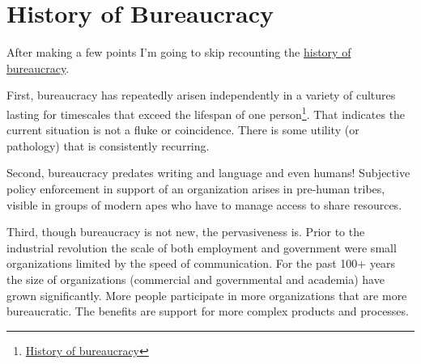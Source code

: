 \section{History of Bureaucracy}

After making a few points I'm going to skip recounting the \href{https://en.wikipedia.org/wiki/Bureaucracy#History}{history of bureaucracy}.  %

First, bureaucracy has repeatedly arisen independently in a variety of cultures lasting for timescales that exceed the lifespan of one person\footnote{\href{https://www.youtube.com/watch?v=B_nsZlcC12g}{History of bureaucracy}}. That indicates the current situation is not a fluke or coincidence. There is some utility (or pathology) that is consistently recurring. 


Second, bureaucracy predates writing and language and even humans! Subjective policy enforcement in support of an organization arises in pre-human tribes, visible in groups of modern apes who have to manage access to share resources. 


Third, though bureaucracy is not new, the pervasiveness is. Prior to the industrial revolution the scale of both employment and government were small organizations limited by the speed of communication. For the past 100+ years the size of organizations (commercial and governmental and academia) have grown significantly. More people participate in more organizations that are more bureaucratic. The benefits are support for more complex products and processes. 

